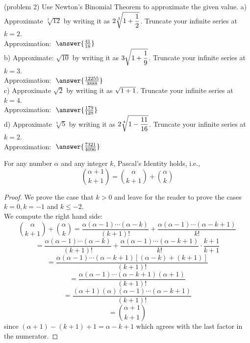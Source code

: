 \documentclass[handout]{ximera}
\begin{document}
\begin{problem}(problem 2) Use Newton's Binomial Theorem to approximate the given value. 
a) Approximate $\sqrt[3]{12}$ by writing it as $\displaystyle 2 \sqrt[3]{1+\frac12}$. 
Truncate your infinite series at $k = 2$.\\
Approximation: $\; \answer{\frac{41}{18}}\;$  \\

b) Approximate: $\sqrt{10}$ by writing it as $\displaystyle 3 \sqrt{1+\frac19}$.  
Truncate your infinite series at $k = 3$. \\ 
Approximation: $\; \answer{\frac{12255}{3888}}\;$ \\

c) Approximate $\sqrt{2}$ by writing it as $\displaystyle  \sqrt{1+1}$.  Truncate your infinite series at $k = 4$. \\ 
Approximation: $\; \answer{\frac{179}{128}}$ \\


d) Approximate $\sqrt[4]{5}$ by writing it as $\displaystyle 2 \sqrt[4]{1-\frac{11}{16}}$.  Truncate your infinite series at $k = 2$. \\ 
Approximation: $\; \answer{\frac{7321}{4096}}\;$ \\

\end{problem}

\begin{proposition}
For any number $\alpha$ and any integer $k$, Pascal's Identity holds, i.e.,
\[
\binom{\alpha +1}{k+1} = \binom{\alpha}{k+1}+\binom{\alpha}{k}
\]
\end{proposition}

\begin{proof}
We prove the case that $k > 0$ and leave for the reader to prove the cases $k=0, k = -1$ and $k \leq -2$.\\
We compute the right hand side:
\[
\binom{\alpha}{k+1}+\binom{\alpha}{k} = \frac{\alpha (\alpha - 1) \cdots (\alpha -k)}{(k+1)!} + 
\frac{\alpha (\alpha - 1) \cdots (\alpha -k+1)}{k!}
\]
\[
= \frac{\alpha (\alpha - 1) \cdots (\alpha -k)}{(k+1)!} + \frac{\alpha (\alpha - 1) \cdots (\alpha -k+1)}{k!} \cdot \frac{k+1}{k+1}
\]
\[
= \frac{\alpha (\alpha - 1) \cdots (\alpha -k + 1)[(\alpha -k) + (k+1)]}{(k+1)!}
\]
\[
= \frac{\alpha (\alpha - 1) \cdots (\alpha -k + 1)(\alpha +1)}{(k+1)!}
\]
\[
= \frac{(\alpha +1)(\alpha) (\alpha - 1) \cdots (\alpha -k + 1)}{(k+1)!}
\]
\[
=\binom{\alpha+1}{k+1}
\]
since $(\alpha + 1) - (k+1) +1 = \alpha -k +1$ which agrees with the last factor in the numerator.
\end{proof}
\end{document}
